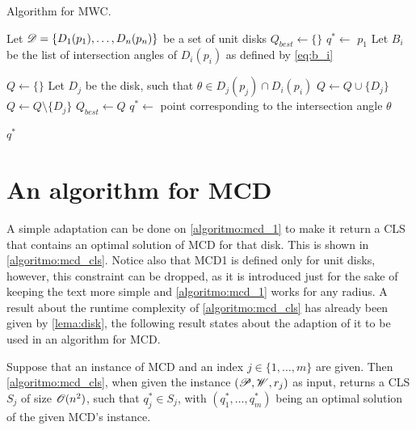 \begin{algoritmo}[b]
\caption{Algorithm for MWC.}\label{algoritmo:mcd_1}
\begin{algorithmic}[1]

\item[]

\State Let $\mathscr{D}=\{D_1(p_1), \dots, D_n(p_n)\}$ be a set of unit disks
\State $Q_{best} \gets \{\}$
\State $q^* \gets$ $p_1$
\State Let $B_i$ be the list of intersection angles of $D_i(p_i)$ as defined by \autoref{eq:b_i}

\State $Q \gets \{\}$ 
\State Let $D_j$ be the disk, such that $\theta \in D_j(p_j)\cap D_i(p_i)$
\State $Q \gets Q \cup \{D_j\}$
\Else
\State $Q \gets Q \setminus \{D_j\}$
\EndIf
{} 
\State $Q_{best} \gets Q$
\State $q^* \gets$ point corresponding to the intersection angle $\theta$
\EndIf

\EndFor
\EndFor

\State \Return $q^*$
\EndProcedure
\end{algorithmic}
\end{algoritmo}

\section{An algorithm for MCD}

A simple adaptation can be done on \autoref{algoritmo:mcd_1} to make it return a CLS that contains an optimal solution of MCD for that disk. This is shown in \autoref{algoritmo:mcd_cls}. 
Notice also that MCD1 is defined only for unit disks, however, this constraint can be dropped, as it is introduced just for the sake of keeping the text more simple and \autoref{algoritmo:mcd_1} works for any radius. A result about the runtime complexity of \autoref{algoritmo:mcd_cls} has already been given by \autoref{lema:disk}, the following result states about the adaption of it to be used in an algorithm for MCD.

\begin{lema}\label{lema:mcd}
	Suppose that an instance of MCD and an index $j\in\{1, \dots, m\}$ are given.
	Then \autoref{algoritmo:mcd_cls}, when given the instance $(\mathscr{P}, \mathscr{W}, r_j)$ as input, returns a CLS $S_j$ of size $\mathscr{O}(n^2)$, such that $q^*_j\in S_j$, with $(q^*_1, \dots, q^*_m)$ being an optimal solution of the given MCD's instance.
\end{lema}

